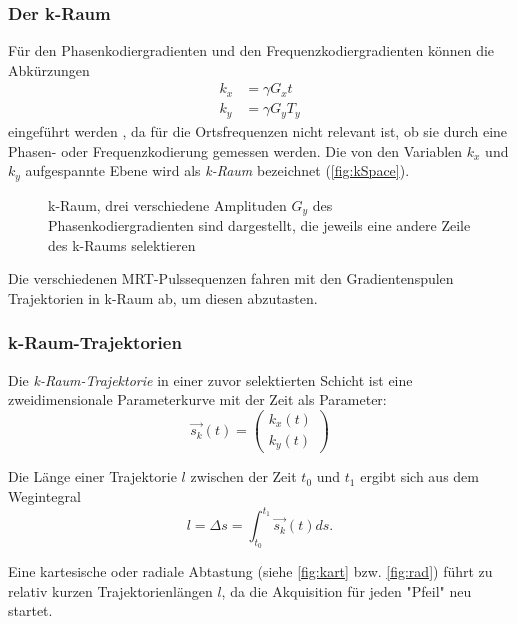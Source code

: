 \subsubsection{Der k-Raum}
Für den Phasenkodiergradienten und den Frequenzkodiergradienten können die Abkürzungen
\begin{subequations}
	\label{eq:kSpaceEq}
	\begin{align}
	k_x & = \gamma G_x t \\
	k_y & = \gamma G_y T_y 
	\end{align}
\end{subequations}
eingeführt werden \cite[S.~333]{Doessel2016}, da für die Ortsfrequenzen nicht relevant ist, ob sie durch eine Phasen- oder Frequenzkodierung gemessen werden. Die von den Variablen $k_x$ und $k_y$ aufgespannte Ebene wird als \textit{k-Raum} bezeichnet (\autoref{fig:kSpace}).

\begin{figure}[H]
	\centering
	\caption[k-Raum]{k-Raum, drei verschiedene Amplituden $G_y$ des Phasenkodiergradienten sind dargestellt, die jeweils eine andere Zeile des k-Raums selektieren}
	\label{fig:kSpace}
\end{figure} 

Die verschiedenen MRT-Pulssequenzen fahren mit den Gradientenspulen Trajektorien in k-Raum ab, um diesen abzutasten.

\subsubsection{k-Raum-Trajektorien}
Die \textit{k-Raum-Trajektorie} in einer zuvor selektierten Schicht ist eine zweidimensionale Parameterkurve mit der Zeit als Parameter:
\begin{equation}
\vec{s_k}(t)=\begin{pmatrix}k_x(t) \\ k_y(t)\end{pmatrix}
\end{equation}

Die Länge einer Trajektorie $l$ zwischen der Zeit $t_0$ und $t_1$ ergibt sich aus dem Wegintegral
\begin{equation}
l=\Delta s = \int_{t_0}^{t_1} \vec{s_k}(t) ds.
\end{equation}

Eine kartesische oder radiale Abtastung (siehe \autoref{fig:kart} bzw. \autoref{fig:rad}) führt zu relativ kurzen Trajektorienlängen $l$, da die Akquisition für jeden "Pfeil" neu startet.

